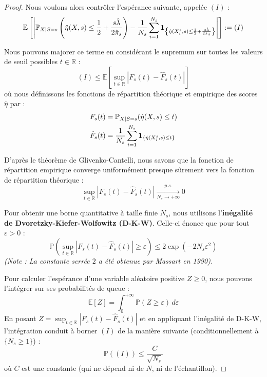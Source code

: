 \begin{proof}
    Nous voulons alors contrôler l'espérance suivante, appelée $(I)$ :
    \begin{equation}
        \mathbb{E} \left[ \left| \mathbb{P}_{X|S=s} \left( \hat{\eta}(X,s) \le \frac{1}{2} + \frac{s\hat{\lambda}}{2\hat{\pi}_s} \right) - \frac{1}{N_s} \sum_{i=1}^{N_s} \mathbf{1}_{\left\{ \hat{\eta}(X_i^s, s) \le \frac{1}{2} + \frac{s\hat{\lambda}}{2\hat{\pi}_s} \right\}} \right| \right] := (I)
    \end{equation}
    
    Nous pouvons majorer ce terme en considérant le supremum sur toutes les valeurs de seuil possibles $t \in \mathbb{R}$ :
    \begin{equation}
        (I) \le \mathbb{E} \left[ \sup_{t \in \mathbb{R}} \left| F_s(t) - \hat{F}_s(t) \right| \right]
    \end{equation}
    où nous définissons les fonctions de répartition théorique et empirique des scores $\hat{\eta}$ par :
    \begin{align}
        F_s(t) &= \mathbb{P}_{X|S=s}(\hat{\eta}(X, s) \le t) \\
        \hat{F}_s(t) &= \frac{1}{N_s} \sum_{i=1}^{N_s} \mathbf{1}_{\{\hat{\eta}(X_i^s, s) \le t\}}
    \end{align}

    \begin{remarque}
        D'après le théorème de Glivenko-Cantelli, nous savons que la fonction de répartition empirique converge uniformément presque sûrement vers la fonction de répartition théorique :
        \begin{equation*}
            \sup_{t \in \mathbb{R}} \left| F_s(t) - \hat{F}_s(t) \right| \xrightarrow[N_s \to +\infty]{p.s.} 0
        \end{equation*}
    \end{remarque}

    Pour obtenir une borne quantitative à taille finie $N_s$, nous utilisons l'\textbf{inégalité de Dvoretzky-Kiefer-Wolfowitz (D-K-W)}. Celle-ci énonce que pour tout $\varepsilon > 0$ :
    \begin{equation}
        \mathbb{P} \left( \sup_{t \in \mathbb{R}} \left| F_s(t) - \hat{F}_s(t) \right| \ge \varepsilon \right) \le 2 \exp(-2 N_s \varepsilon^2)
    \end{equation}
    \textit{(Note : La constante serrée $2$ a été obtenue par Massart en 1990).}
    
    Pour calculer l'espérance d'une variable aléatoire positive $Z \ge 0$, nous pouvons l'intégrer sur ses probabilités de queue :
    \begin{equation}
        \mathbb{E}[Z] = \int_{0}^{+\infty} \mathbb{P}(Z \ge \varepsilon) \, d\varepsilon
    \end{equation}
    En posant $Z = \sup_{t \in \mathbb{R}} \left| F_s(t) - \hat{F}_s(t) \right|$ et en appliquant l'inégalité de D-K-W, l'intégration conduit à borner $(I)$ de la manière suivante (conditionnellement à $\{N_s \ge 1\}$) :
    \begin{equation}
        \mathbb{P}((I)) \le \frac{C}{\sqrt{N_s}}
    \end{equation}
    où $C$ est une constante (qui ne dépend ni de $N$, ni de l'échantillon).
    

\end{proof}
